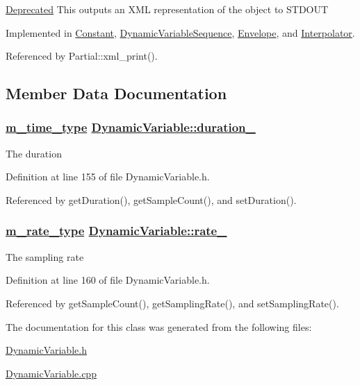 \begin{Desc}
\item[\hyperlink{deprecated__deprecated000007}{Deprecated}]This outputs an XML representation of the object to STDOUT \end{Desc}


Implemented in \hyperlink{classConstant_a7}{Constant}, \hyperlink{classDynamicVariableSequence_a27}{Dynamic\-Variable\-Sequence}, \hyperlink{classEnvelope_a29}{Envelope}, and \hyperlink{classInterpolator_a7}{Interpolator}.

Referenced by Partial::xml\_\-print().

\subsection{Member Data Documentation}
\hypertarget{classDynamicVariable_r0}{
\subsubsection[duration\_\-]{\setlength{\rightskip}{0pt plus 5cm}\hyperlink{Types_8h_a2}{m\_\-time\_\-type} \hyperlink{classDynamicVariable_r0}{Dynamic\-Variable::duration\_\-}}}
\label{classDynamicVariable_r0}


The duration 

Definition at line 155 of file Dynamic\-Variable.h.

Referenced by get\-Duration(), get\-Sample\-Count(), and set\-Duration().\hypertarget{classDynamicVariable_r1}{
\subsubsection[rate\_\-]{\setlength{\rightskip}{0pt plus 5cm}\hyperlink{Types_8h_a4}{m\_\-rate\_\-type} \hyperlink{classDynamicVariable_r1}{Dynamic\-Variable::rate\_\-}}}
\label{classDynamicVariable_r1}


The sampling rate 

Definition at line 160 of file Dynamic\-Variable.h.

Referenced by get\-Sample\-Count(), get\-Sampling\-Rate(), and set\-Sampling\-Rate().

The documentation for this class was generated from the following files:\begin{CompactItemize}
\item 
\hyperlink{DynamicVariable_8h}{Dynamic\-Variable.h}\item 
\hyperlink{DynamicVariable_8cpp}{Dynamic\-Variable.cpp}\end{CompactItemize}
